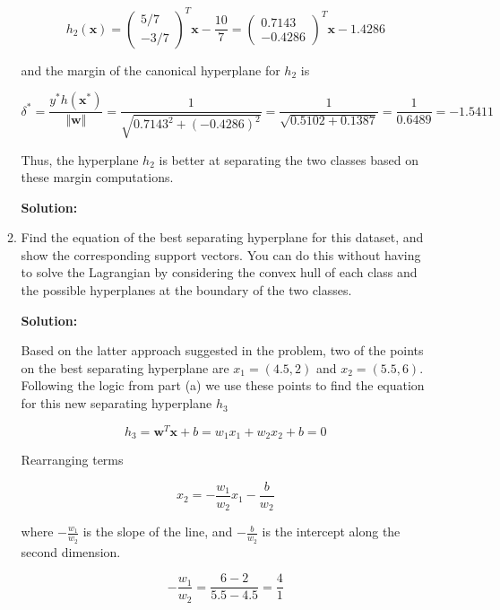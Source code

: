\documentclass[11pt]{article}
\begin{document}
\begin{enumerate}
\begin{enumerate}
\begin{equation*}
h_2(\mathbf{x})
=
\left(\begin{array}{c}
5/7 \\ -3/7
\end{array}\right)^\mathit{T} \mathbf{x} - \frac{10}{7}
=
\left(\begin{array}{c}
0.7143 \\ -0.4286
\end{array}\right)^\mathit{T} \mathbf{x} - 1.4286
\end{equation*}

and the margin of the canonical hyperplane for $h_2$ is

\begin{equation*}
\delta^*
=
\frac{y^*h(\mathbf{x}^*)}{\Vert \mathbf{w} \Vert}
=
\frac{1}{\sqrt{0.7143^2 + (-0.4286)^2}}
=
\frac{1}{\sqrt{0.5102 + 0.1387}}
=
\frac{1}{0.6489}
=
-1.5411
\end{equation*}

Thus, the hyperplane $h_2$ is better at separating the two classes based on these margin computations.

\textbf{Solution:}

\item Find the equation of the best separating hyperplane for this dataset, and show the corresponding support vectors. You can do this without having to solve the Lagrangian by considering the convex hull of each class and the possible hyperplanes at the boundary of the two classes.

\textbf{Solution:}

Based on the latter approach suggested in the problem, two of the points on the best separating hyperplane are $x_1 = (4.5, 2)$ and $x_2 = (5.5, 6)$. Following the logic from part (a) we use these points to find the equation for this new separating hyperplane $h_3$

\begin{equation*}
h_3 = \mathbf{w}^\mathit{T} \mathbf{x} + b = w_1 x_1 + w_2 x_2 + b = 0
\end{equation*}

Rearranging terms

\begin{equation*}
x_2 = - \frac{w_1}{w_2} x_1 - \frac{b}{w_2}
\end{equation*}

where $- \frac{w_1}{w_2}$ is the slope of the line, and $- \frac{b}{w_2}$ is the intercept along the second dimension.

\begin{equation*}
-\frac{w_1}{w_2} = \frac{6-2}{5.5-4.5} = \frac{4}{1}
\end{equation*}


\end{enumerate}
\end{enumerate}
\end{document}
